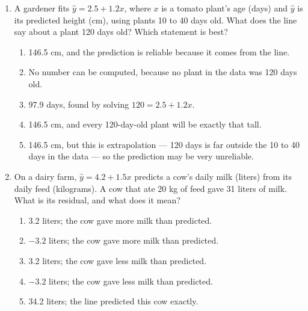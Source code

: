\documentclass[12pt]{article}
\begin{document}
\begin{enumerate}[leftmargin=1.9em, itemsep=0.13in]
  \boxguard[10]%
  \item A gardener fits $\hat{y} = 2.5 + 1.2x$, where $x$ is a tomato plant's age (days) and
        $\hat{y}$ is its predicted height (cm), using plants 10 to 40 days old. What does the
        line say about a plant 120 days old? Which statement is best?
        \begin{enumerate}[label=\textbf{(\Alph*)}, leftmargin=2.2em, itemsep=2pt]
          \item 146.5 cm, and the prediction is reliable because it comes from the line.
          \item No number can be computed, because no plant in the data was 120 days old.
          \item 97.9 days, found by solving $120 = 2.5 + 1.2x$.
          \item 146.5 cm, and every 120-day-old plant will be exactly that tall.
          \item 146.5 cm, but this is extrapolation --- 120 days is far outside the 10 to 40
                days in the data --- so the prediction may be very unreliable.\hfill{}\rule[-0.2in]{0pt}{0.48in}
        \end{enumerate}

  \boxguard[9]%
  \item On a dairy farm, $\hat{y} = 4.2 + 1.5x$ predicts a cow's daily milk (liters) from its
        daily feed (kilograms). A cow that ate 20 kg of feed gave 31 liters of milk. What is
        its residual, and what does it mean?
        \begin{enumerate}[label=\textbf{(\Alph*)}, leftmargin=2.2em, itemsep=2pt]
          \item 3.2 liters; the cow gave more milk than predicted.
          \item $-3.2$ liters; the cow gave more milk than predicted.
          \item 3.2 liters; the cow gave less milk than predicted.
          \item $-3.2$ liters; the cow gave less milk than predicted.
          \item 34.2 liters; the line predicted this cow exactly.\hfill{}\rule[-0.2in]{0pt}{0.48in}
        \end{enumerate}


\end{enumerate}
\end{document}
